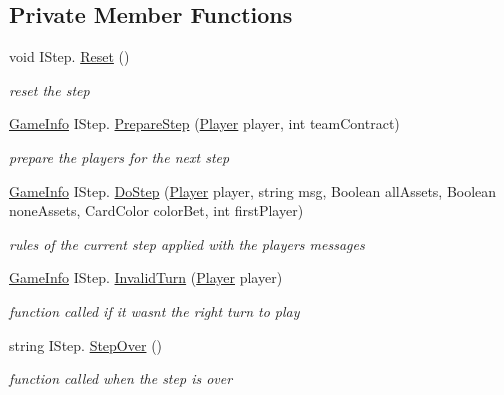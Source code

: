 \subsection*{Private Member Functions}
\begin{DoxyCompactItemize}
\item 
void I\+Step. \hyperlink{class_server_1_1_game_rules_1_1_steps_1_1_counter_1_1_counter_a7e681c51f20d2509e0b53dede3d73dc0}{Reset} ()
\begin{DoxyCompactList}\small\item\em reset the step \end{DoxyCompactList}\item 
\hyperlink{class_coinche_1_1_tools_1_1_game_info}{Game\+Info} I\+Step. \hyperlink{class_server_1_1_game_rules_1_1_steps_1_1_counter_1_1_counter_a84412648384fce7fea870e5e1e32bc3d}{Prepare\+Step} (\hyperlink{class_coinche_1_1_player}{Player} player, int team\+Contract)
\begin{DoxyCompactList}\small\item\em prepare the players for the next step \end{DoxyCompactList}\item 
\hyperlink{class_coinche_1_1_tools_1_1_game_info}{Game\+Info} I\+Step. \hyperlink{class_server_1_1_game_rules_1_1_steps_1_1_counter_1_1_counter_aba717018db3366659fdb4ac302d19937}{Do\+Step} (\hyperlink{class_coinche_1_1_player}{Player} player, string msg, Boolean all\+Assets, Boolean none\+Assets, Card\+Color color\+Bet, int first\+Player)
\begin{DoxyCompactList}\small\item\em rules of the current step applied with the players messages \end{DoxyCompactList}\item 
\hyperlink{class_coinche_1_1_tools_1_1_game_info}{Game\+Info} I\+Step. \hyperlink{class_server_1_1_game_rules_1_1_steps_1_1_counter_1_1_counter_a81fc65a550bef61081dd1ec351b3bdaf}{Invalid\+Turn} (\hyperlink{class_coinche_1_1_player}{Player} player)
\begin{DoxyCompactList}\small\item\em function called if it wasn\textquotesingle{}t the right turn to play \end{DoxyCompactList}\item 
string I\+Step. \hyperlink{class_server_1_1_game_rules_1_1_steps_1_1_counter_1_1_counter_a75247ce8610225edadc753a432dd9c56}{Step\+Over} ()
\begin{DoxyCompactList}\small\item\em function called when the step is over \end{DoxyCompactList}\end{DoxyCompactItemize}
